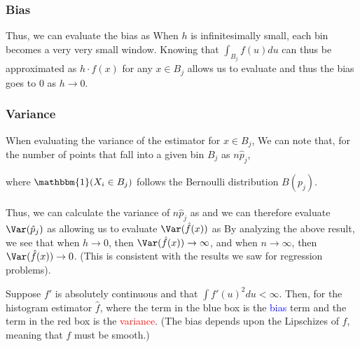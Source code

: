 \subsubsection{Bias}
Thus, we can evaluate the bias as
When $h$ is infinitesimally small, each bin becomes a very very small window. Knowing that $\int_{B_j}f(u)du$ can thus be approximated as $h \cdot f(x)$ for any $x \in B_j$ allows us to evaluate
and thus the bias goes to $0$ as $h \to 0$.
\subsubsection{Variance}
When evaluating the variance of the estimator for $x \in B_j$,
We can note that, for the number of points that fall into a given bin $B_j$ as $n\hat{p}_j$,

where $\mathbbm{1}(X_i \in B_j)$ follows the Bernoulli distribution $B(p_j)$. \\ \\
Thus, we can calculate the variance of $n\hat{p}_j$ as
and we can therefore evaluate $\Var(\hat{p}_j)$ as
allowing us to evaluate $\Var(\hat{f}(x))$ as
By analyzing the above result, we see that when $h \to 0$, then $\Var(\hat{f}(x)) \to \infty$, and when $n \to \infty$, then $\Var(\hat{f}(x)) \to 0$. (This is consistent with the results we saw for regression problems).

\begin{theorem} 
	Suppose $f'$ is absolutely continuous and that $\int f'(u)^2 du < \infty$. Then, for the histogram estimator $\hat{f}$, 
	where the term in the blue box is the \textcolor{blue}{bias} term and the term in the red box is the \textcolor{red}{variance}. (The bias depends upon the Lipschizes of $f$, meaning that $f$ must be smooth.)
\end{theorem}

